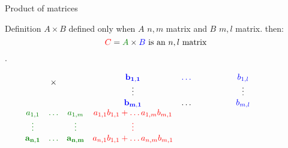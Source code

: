 \documentclass{beamer}
\begin{document}
\begin{frame}{Product of matrices}

  \begin{block}{Definition}
    \alert{$A \times B$ defined only when $A$ $n,m$ matrix and $B$ $m,l$ matrix.} then: \[{\color{red}C} = {\color{darkgreen} A} \times {\color{blue} B}\textnormal{  is an $n,l$ matrix} \].
    
    \[
    \begin{array}{cccccc}
      & \multirow{2}{*}{$\times$} & & \bf \color{blue}b_{1,1} &\color{blue} \dots & \color{blue} b_{1,l}\\
      &                           & & \bf \vdots &       & \vdots\\
      &                           & &\bf \color{blue} b_{m,1}  & \dots & \color{blue}b_{m, l}\\
      \color{darkgreen}a_{1,1} &\color{darkgreen} \dots & \color{darkgreen}a_{1,m} & \color{red}a_{1,1}b_{1,1} + \dots a_{1,m}b_{m,1}  & \phantom{\color{red}\dots}  & \phantom{\color{red}a_{1,1}b_{1, l} + \dots + a_{1, m}b_{m, l}}\\
      \color{darkgreen}\vdots &       & \color{darkgreen}\vdots  &\color{red}\vdots  &  &\phantom{\color{red}\vdots} \\
      \bf \color{darkgreen}a_{n,1} & \bf \color{darkgreen}\dots & \bf \color{darkgreen}a_{n, m}& \color{red}a_{n,1}b_{1,1} + \dots a_{n,m}b_{m,1}  & \phantom{\color{red}\dots}  & \phantom{\color{red}a_{n,1}b_{1, l} + \dots + a_{n, m}b_{m, l}}\\
    \end{array}
    \]
    
  \end{block}
  
\end{frame}
\end{document}
